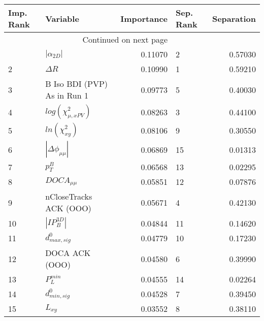 \usepackage{lscape}

\begin{landscape}
\begin{longtable}{llrlr}
\toprule
Imp. Rank &                     Variable &  Importance & Sep. Rank &  Separation \\
\midrule
\endhead
\midrule
\multicolumn{3}{r}{{Continued on next page}} \\
\midrule
\endfoot

\bottomrule
\endlastfoot
        1 &              $|\alpha_{2D}|$ &     0.11070 &         2 &     0.57030 \\
        2 &                   $\Delta R$ &     0.10990 &         1 &     0.59210 \\
        3 &  B Iso BDI (PVP) As in Run 1 &     0.09773 &         5 &     0.40030 \\
        4 &    $log(\chi^{2}_{\mu,xPV})$ &     0.08263 &         3 &     0.44100 \\
        5 &          $ln(\chi^{2}_{xy})$ &     0.08106 &         9 &     0.30550 \\
        6 &     $|\Delta \phi_{\mu\mu}|$ &     0.06869 &        15 &     0.01313 \\
        7 &                    $p^B_{T}$ &     0.06568 &        13 &     0.02295 \\
        8 &              $DOCA_{\mu\mu}$ &     0.05851 &        12 &     0.07876 \\
        9 &       nCloseTracks ACK (OOO) &     0.05671 &         4 &     0.42130 \\
       10 &              $|IP_{B}^{3D}|$ &     0.04844 &        11 &     0.14620 \\
       11 &             $d^0_{max, sig}$ &     0.04779 &        10 &     0.17230 \\
       12 &               DOCA ACK (OOO) &     0.04580 &         6 &     0.39990 \\
       13 &                $P^{min}_{L}$ &     0.04555 &        14 &     0.02264 \\
       14 &             $d^0_{min, sig}$ &     0.04528 &         7 &     0.39450 \\
       15 &                     $L_{xy}$ &     0.03552 &         8 &     0.38110 \\
\end{longtable}

\end{landscape}

